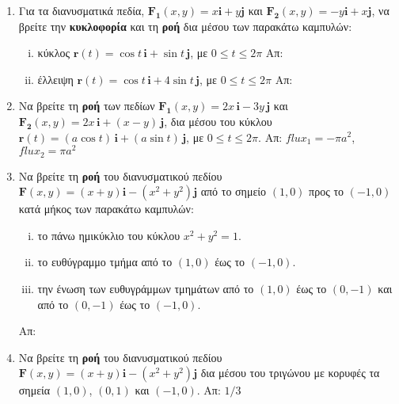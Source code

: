 \begin{enumerate}
  \item Για τα διανυσματικά πεδία, 
    $ \mathbf{F_{1}}(x,y) = x \mathbf{i} + y \mathbf{j} $ και $ \mathbf{F_{2}}(x,y) = 
    -y\mathbf{i} + x \mathbf{j} $, να βρείτε την \textbf{κυκλοφορία} και τη
    \textbf{ροή} δια μέσου των παρακάτω καμπυλών: 
    \begin{enumerate}[i)]
      \item κύκλος $ \mathbf{r}(t)= \cos{t}\, \mathbf{i} + \sin{t}\, \mathbf{j}$, με 
        $ 0 \leq t \leq 2 \pi $ 
        \hfill Απ: 
      \item έλλειψη $ \mathbf{r}(t)= \cos{t}\, \mathbf{i} + 4\sin{t}\, \mathbf{j}$, με 
        $ 0 \leq t \leq 2 \pi $ 
        \hfill Απ:  
    \end{enumerate}

  \item Να βρείτε τη \textbf{ροή} των πεδίων $ \mathbf{F_{1}}(x,y) = 2x \,\mathbf{i} - 3y
    \, \mathbf{j} $ και $ \mathbf{F_{2}}(x,y) = 
    2x \, \mathbf{i} + (x-y)\, \mathbf{j} $, δια μέσου του κύκλου $ \mathbf{r}(t)=(a
    \cos{t})\,
    \mathbf{i} + (a \sin{t})\, \mathbf{j} $, με $ 0 \leq t \leq 2 \pi $.
    \hfill Απ: $ flux_{1}=- \pi a^{2} $, $ flux_{2}= \pi a^{2} $ 

  \item Να βρείτε τη \textbf{ροή} του διανυσματικού πεδίου $ \mathbf{F}(x,y) = (x+y) 
    \mathbf{i} - (x^{2}+y^{2}) \mathbf{j} $ από το σημείο $ (1,0) $ προς το $ (-1,0) $ 
    κατά μήκος των παρακάτω καμπυλών:
    \begin{enumerate}[i)]
      \item το πάνω ημικύκλιο του κύκλου $ x^{2}+y^{2}=1 $.
      \item το ευθύγραμμο τμήμα από το $ (1,0) $ έως το $ (-1,0) $.
      \item την ένωση των ευθυγράμμων τμημάτων από το $ (1,0) $ έως το $ (0,-1) $ και 
        από το $ (0,-1) $ έως το $ (-1,0) $.
    \end{enumerate}
    \hfill Απ: 

  \item Να βρείτε τη \textbf{ροή} του διανυσματικού πεδίου 
    $ \mathbf{F}(x,y) = (x+y) \mathbf{i} - (x^{2}+y^{2}) \mathbf{j} $ δια μέσου 
    του τριγώνου με κορυφές τα σημεία $ (1,0) $, $ (0,1) $ και $ (-1,0) $. 
    \hfill Απ: $1/3$ 

\end{enumerate}







